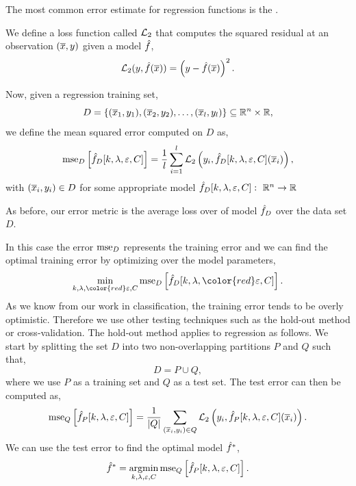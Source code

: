 \documentclass[a4paper,blends,pdf,colorBG,slideColor]{prosper}
\begin{document}
The most common error estimate for regression functions is the .

We define a loss function called ${\cal L}_2$ that computes the squared residual at an observation $(\overline{x},y)$ given a model
$\hat{f}$,
\begin{equation*}
{\cal L}_2(y, \hat{f}(\overline{x})) = \left(y - \hat{f}(\overline{x})\right)^2.
\end{equation*}

Now, given a regression training set,
\begin{equation*}
D = \{(\overline{x}_1,y_1),(\overline{x}_2,y_2),\ldots,(\overline{x}_l,y_l)\} \subseteq \mathbb{R}^{n} \times \mathbb{R},
\end{equation*}
we define the mean squared error computed on $D$ as,
\begin{equation*}
\mbox{mse}_D\left[\hat{f}_D[k,\lambda,\varepsilon,C]\right] = \frac{1}{l}\sum_{i=1}^{l}{\cal L}_2\left(y_i, \hat{f}_D[k,\lambda,\varepsilon,C](\overline{x}_i)\right),
\end{equation*}
with $(\overline{x}_i,y_i)\in D$ for some appropriate model $\hat{f}_D[k,\lambda,\varepsilon,C] \,\colon\; \mathbb{R}^{n} \rightarrow \mathbb{R}$

As before, our error metric is the average loss over of model $\hat{f}_D$ over the data set $D$.

\es

\small
In this case the error $\mbox{mse}_D$ represents the training error and we can find the optimal training
error by optimizing over the model parameters,
\begin{equation*}
\min_{k,\lambda,{\color{red}\varepsilon},C} \mse_D\left[\model{f}_D[k,\lambda,{\color{red}\varepsilon},C]\right].
\end{equation*}
As we know from our work in classification, the training error tends to be overly optimistic. 
Therefore we use other testing techniques such as the hold-out method or cross-validation.
The hold-out method applies to regression as follows.
We start by splitting the set $D$ into two non-overlapping partitions $P$ and $Q$ such that,
\begin{equation*}
D = P \cup Q,
\end{equation*}
where we use $P$ as a training set and $Q$ as a test set.
The test error can then be computed as,
\begin{equation*}
\mbox{mse}_Q\left[\hat{f}_P[k,\lambda,\varepsilon,C]\right] = \frac{1}{{|{Q}|}}\sum_{(\overline{x}_i,y_i)\in Q}{\cal L}_2\left(y_i,\hat{f}_P[k,\lambda,\varepsilon,C](\overline{x}_i)\right).
\end{equation*}
We can use the test error to find the optimal model $\hat{f}^*$,
\begin{equation*}
\model{f}^* = \argmin_{k,\lambda,\varepsilon,C} \mse_Q\left[\model{f}_P[k,\lambda,\varepsilon,C]\right] .
\end{equation*}
\end{document}
